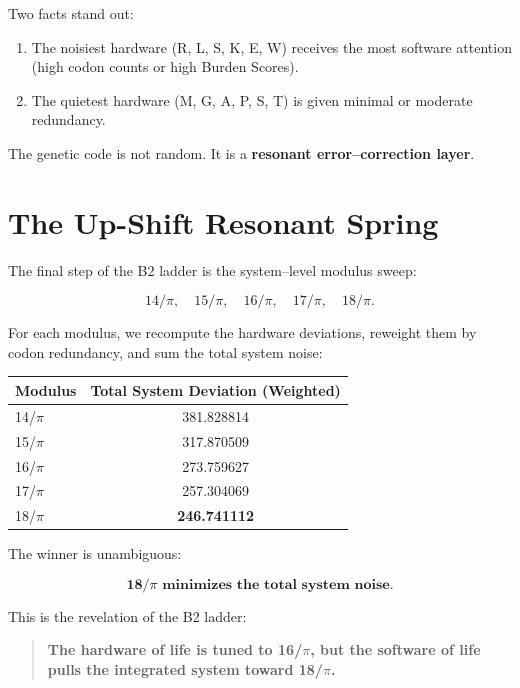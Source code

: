 \documentclass[11pt, letterpaper, openany]{book}
\begin{document}
Two facts stand out:

\begin{enumerate}
    \item The noisiest hardware (R, L, S, K, E, W) receives the most software
          attention (high codon counts or high Burden Scores).

    \item The quietest hardware (M, G, A, P, S, T) is given minimal or moderate
          redundancy.
\end{enumerate}

The genetic code is not random.  
It is a \textbf{resonant error–correction layer}.

\section{The Up-Shift Resonant Spring}

The final step of the B2 ladder is the system–level modulus sweep:



\[
14/\pi,\quad 15/\pi,\quad 16/\pi,\quad 17/\pi,\quad 18/\pi.
\]



For each modulus, we recompute the hardware deviations, reweight them by codon
redundancy, and sum the total system noise:

\begin{center}
\begin{tabular}{lc}
\toprule
\textbf{Modulus} & \textbf{Total System Deviation (Weighted)} \\
\midrule
14/$\pi$ & 381.828814 \\
15/$\pi$ & 317.870509 \\
16/$\pi$ & 273.759627 \\
17/$\pi$ & 257.304069 \\
18/$\pi$ & \textbf{246.741112} \\
\bottomrule
\end{tabular}
\end{center}

The winner is unambiguous:  


\[
\textbf{18/$\pi$ minimizes the total system noise.}
\]



This is the revelation of the B2 ladder:

\begin{quote}
\textbf{The hardware of life is tuned to 16/$\pi$, but the software of life
pulls the integrated system toward 18/$\pi$.}
\end{quote}
\end{document}
